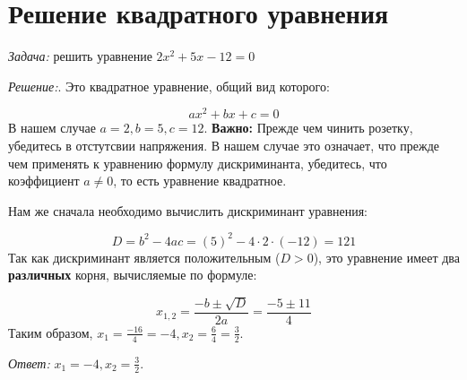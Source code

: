\documentclass{article}
\begin{document}
\section{Решение квадратного уравнения}
\textit{Задача:} решить уравнение \(2x^2 + 5x - 12 = 0\)

\textit{Решение:}. Это квадратное уравнение, общий вид которого:

\[ ax^2 + bx + c = 0 \]
В нашем случае \(a = 2, b = 5, c = 12\). \textbf{Важно:} Прежде чем чинить розетку, убедитесь в отстутсвии напряжения. В нашем случае это означает, что прежде чем применять к уравнению формулу дискриминанта, убедитесь, что коэффициент \(a \neq 0\), то есть уравнение квадратное.

Нам же сначала необходимо вычислить дискриминант уравнения:

\[ D = b^2 - 4ac = (5)^2 - 4 \cdot 2 \cdot (-12) = 121 \]
Так как дискриминант является положительным (\(D > 0\)), это уравнение имеет два \textbf{различных} корня, вычисляемые по формуле:

\[ x_{1,2} = \frac{-b \pm \sqrt{D}}{2a} = \frac{-5 \pm 11}{4} \]
Таким образом, \(x_1 = \frac{-16}{4} = -4, x_2 = \frac{6}{4} = \frac{3}{2} \).

\textit{Ответ:} \(x_1 = -4, x_2 = \frac{3}{2} \).
\end{document}
